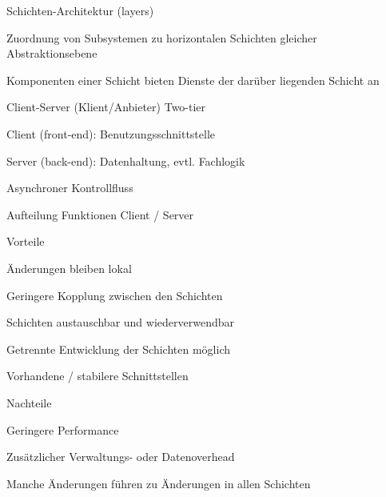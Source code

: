 \documentclass[a4paper]{article}
\begin{document}
\begin{multicols}{3}
  Schichten-Architektur (layers)
  \begin{itemize*}
    \item Zuordnung von Subsystemen zu horizontalen Schichten gleicher Abstraktionsebene
    \item Komponenten einer Schicht bieten Dienste der darüber liegenden Schicht an
  \end{itemize*}

  Client-Server (Klient/Anbieter) Two-tier
  \begin{itemize*}
    \item Client (front-end): Benutzungsschnittstelle
    \item Server (back-end): Datenhaltung, evtl. Fachlogik
    \item Asynchroner Kontrollfluss
    \item Aufteilung Funktionen Client / Server
    \item Vorteile
    \begin{itemize*}
      \item Änderungen bleiben lokal
      \item Geringere Kopplung zwischen den Schichten
      \item Schichten austauschbar und wiederverwendbar
      \item Getrennte Entwicklung der Schichten möglich
      \item Vorhandene / stabilere Schnittstellen
    \end{itemize*}
    \item Nachteile
    \begin{itemize*}
      \item Geringere Performance
      \item Zusätzlicher Verwaltungs- oder Datenoverhead
      \item Manche Änderungen führen zu Änderungen in allen Schichten
    \end{itemize*}
  \end{itemize*}


\end{multicols}
\end{document}
